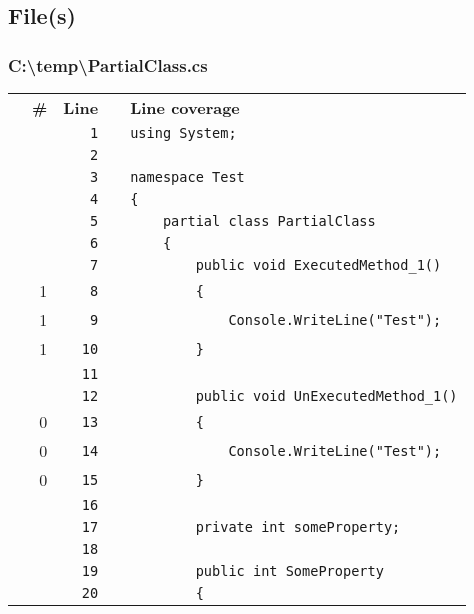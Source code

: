 \documentclass[a4paper,landscape,10pt]{article}
\begin{document}
\subsection{File(s)}
\subsubsection{C:\textbackslash temp\textbackslash PartialClass.cs}
\begin{longtable}[l]{lrrll}
\textbf{} & \textbf{\#} & \textbf{Line} & \textbf{} & \textbf{Line coverage}\\
\cellcolor{gray} &  & \verb~1~ & & \verb~using System;~\\
\cellcolor{gray} &  & \verb~2~ & & \verb~~\\
\cellcolor{gray} &  & \verb~3~ & & \verb~namespace Test~\\
\cellcolor{gray} &  & \verb~4~ & & \verb~{~\\
\cellcolor{gray} &  & \verb~5~ & & \verb~    partial class PartialClass~\\
\cellcolor{gray} &  & \verb~6~ & & \verb~    {~\\
\cellcolor{gray} &  & \verb~7~ & & \verb~        public void ExecutedMethod_1()~\\
\cellcolor{green} & 1 & \verb~8~ & & \verb~        {~\\
\cellcolor{green} & 1 & \verb~9~ & & \verb~            Console.WriteLine("Test");~\\
\cellcolor{green} & 1 & \verb~10~ & & \verb~        }~\\
\cellcolor{gray} &  & \verb~11~ & & \verb~~\\
\cellcolor{gray} &  & \verb~12~ & & \verb~        public void UnExecutedMethod_1()~\\
\cellcolor{red} & 0 & \verb~13~ & & \verb~        {~\\
\cellcolor{red} & 0 & \verb~14~ & & \verb~            Console.WriteLine("Test");~\\
\cellcolor{red} & 0 & \verb~15~ & & \verb~        }~\\
\cellcolor{gray} &  & \verb~16~ & & \verb~~\\
\cellcolor{gray} &  & \verb~17~ & & \verb~        private int someProperty;~\\
\cellcolor{gray} &  & \verb~18~ & & \verb~~\\
\cellcolor{gray} &  & \verb~19~ & & \verb~        public int SomeProperty~\\
\cellcolor{gray} &  & \verb~20~ & & \verb~        {~\\

\end{longtable}
\end{document}
